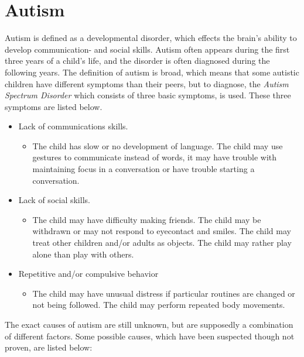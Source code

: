 \section{Autism}
Autism is defined as a developmental disorder, which effects the brain's ability to develop communication- and social skills. Autism often appears during the first three years of a child's life, and the disorder is often diagnosed during the following years.
The definition of autism is broad, which means that some autistic children have different symptoms than their peers, but to diagnose, the \textit{Autism Spectrum Disorder} which consists of three basic symptoms, is used. These three symptoms are listed below.
\begin{itemize}

  \item{Lack of communications skills.}
   \begin{itemize}
     \item{The child has slow or no development of language. The child may use gestures to communicate instead of words, it may have trouble with maintaining focus in a conversation or have trouble starting a conversation.}
   \end{itemize}
   
  \item{Lack of social skills.}
   \begin{itemize}
     \item{The child may have difficulty making friends. The child may be withdrawn or may not respond to eyecontact and smiles. The child may treat other children and/or adults as objects. The child may rather play alone than play with others.}
   \end{itemize}

  \item{Repetitive and/or compulsive behavior}
    \begin{itemize}
      \item{The child may have unusual distress if particular routines are changed or not being followed. The child may perform repeated body movements.}
    \end{itemize}
  
\end{itemize}

The exact causes of autism are still unknown, but are supposedly a combination of different factors.%
Some possible causes, which have been suspected though not proven, are listed below:


